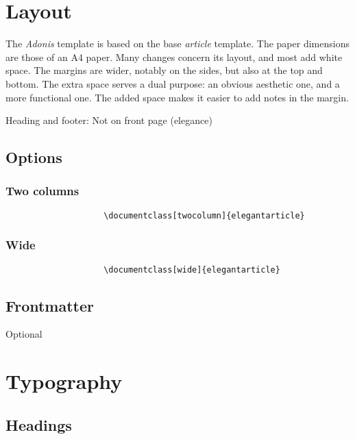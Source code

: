 \documentclass{adonis}
\begin{document}
	\section{Layout}
	
		The \textit{Adonis} template is based on the base \textit{article} template.
		The paper dimensions are those of an A4 paper.
		Many changes concern its layout, and most add white space.
		The margins are wider, notably on the sides, but also at the top and bottom.
		The extra space serves a dual purpose: an obvious aesthetic one, and a more functional one.
		The added space makes it easier to add notes in the margin.
		
		Heading and footer: Not on front page (elegance)
		
		\subsection{Options}
		
			\subsubsection{Two columns}
			
				\begin{verbatim}
					\documentclass[twocolumn]{elegantarticle}
				\end{verbatim}
			
			\subsubsection{Wide}
			
				\begin{verbatim}
					\documentclass[wide]{elegantarticle}
				\end{verbatim}
	
		\subsection{Frontmatter}
		
			Optional
	
	\section{Typography}
	
		\subsection{Headings}
		
\end{document}
